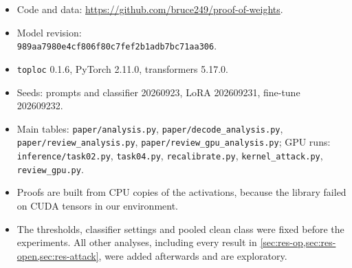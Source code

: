 \documentclass[10pt,twocolumn]{article}
\begin{document}
\begin{itemize}
  \item Code and data: \url{https://github.com/bruce249/proof-of-weights}.
  \item Model revision:\\ {\footnotesize\texttt{989aa7980e4cf806f80c7fef2b1adb7bc71aa306}}.
  \item \texttt{toploc} 0.1.6, PyTorch 2.11.0, transformers 5.17.0.
  \item Seeds: prompts and classifier 20260923, LoRA 202609231, fine-tune 202609232.
  \item Main tables: \texttt{paper/analysis.py}, \texttt{paper/decode\_analysis.py}, \texttt{paper/review\_analysis.py}, \texttt{paper/review\_gpu\_analysis.py}; GPU runs: \texttt{inference/task02.py}, \texttt{task04.py}, \texttt{recalibrate.py}, \texttt{kernel\_attack.py}, \texttt{review\_gpu.py}.
  \item Proofs are built from CPU copies of the activations, because the library failed on CUDA tensors in our environment.
  \item The thresholds, classifier settings and pooled clean class were fixed before the experiments. All other analyses, including every result in \cref{sec:res-op,sec:res-open,sec:res-attack}, were added afterwards and are exploratory.
\end{itemize}
\end{document}
